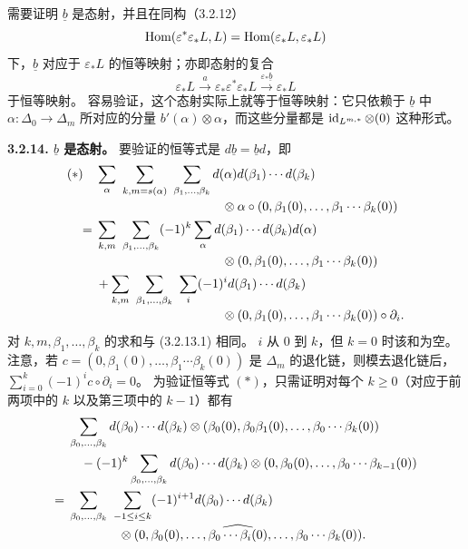 需要证明 $\underline b$ 是态射，并且在同构（3.2.12）
\[
\operatorname{Hom}(\varepsilon^*\varepsilon_*L,L)
 =\operatorname{Hom}(\varepsilon_*L,\varepsilon_*L)
\]
下，$\underline b$ 对应于 $\varepsilon_*L$ 的恒等映射；亦即态射的复合
\[
\varepsilon_*L\xrightarrow{a}
\varepsilon_*\varepsilon^*\varepsilon_*L
 \xrightarrow{\varepsilon_*\underline b}\varepsilon_*L
\]
于恒等映射。
容易验证，这个态射实际上就等于恒等映射：它只依赖于
$\underline b$ 中 $\alpha:\Delta_0\longrightarrow\Delta_m$ 所对应的分量
$b'(\alpha)\otimes\alpha$，而这些分量都是
$\operatorname{id}_{L^{m,*}}\otimes(0)$ 这种形式。

\par\medskip\noindent\textbf{3.2.14. $\underline b$ 是态射。}
要验证的恒等式是 $d\underline b=\underline b d$，即
\[
\begin{aligned}
(*)\quad&\sum_\alpha\ \sum_{k,m=s(\alpha)}\ \sum_{\beta_1,\ldots,\beta_k}
 d(\alpha)d(\beta_1)\cdots d(\beta_k)\\[-2pt]
&\hspace{35mm}\otimes\alpha\circ
 (0,\beta_1(0),\ldots,\beta_1\cdots\beta_k(0))\\
={}&\sum_{k,m}\ \sum_{\beta_1,\ldots,\beta_k}(-1)^k
 \sum_\alpha d(\beta_1)\cdots d(\beta_k)d(\alpha)\\[-2pt]
&\hspace{35mm}\otimes
 (0,\beta_1(0),\ldots,\beta_1\cdots\beta_k(0))\\
&+\sum_{k,m}\ \sum_{\beta_1,\ldots,\beta_k}\ \sum_i(-1)^i
 d(\beta_1)\cdots d(\beta_k)\\[-2pt]
&\hspace{35mm}\otimes
 (0,\beta_1(0),\ldots,\beta_1\cdots\beta_k(0))\circ\partial_i.
\end{aligned}
\]
对 $k,m,\beta_1,\ldots,\beta_k$ 的求和与 (3.2.13.1) 相同。
$i$ 从 $0$ 到 $k$，但 $k=0$ 时该和为空。
注意，若 $c=(0,\beta_1(0),\ldots,\beta_1\cdots\beta_k(0))$
是 $\Delta_m$ 的退化链，则模去退化链后，
$\sum_{i=0}^k(-1)^ic\circ\partial_i=0$。
为验证恒等式
$(*)$，只需证明对每个 $k\geq0$（对应于前两项中的 $k$ 以及第三项中的 $k-1$）都有
\[
\begin{aligned}
&\sum_{\beta_0,\ldots,\beta_k}
 d(\beta_0)\cdots d(\beta_k)
 \otimes(\beta_0(0),\beta_0\beta_1(0),\ldots,\beta_0\cdots\beta_k(0))\\
&\quad-(-1)^k\sum_{\beta_0,\ldots,\beta_k}
 d(\beta_0)\cdots d(\beta_k)
 \otimes(0,\beta_0(0),\ldots,\beta_0\cdots\beta_{k-1}(0))\\
={}&\sum_{\beta_0,\ldots,\beta_k}\ \sum_{-1\leq i\leq k}
 (-1)^{i+1}d(\beta_0)\cdots d(\beta_k)\\[-2pt]
&\hspace{14mm}\otimes
 (0,\beta_0(0),\ldots,\widehat{\beta_0\cdots\beta_i(0)},
 \ldots,\beta_0\cdots\beta_k(0)).
\end{aligned}
\]
